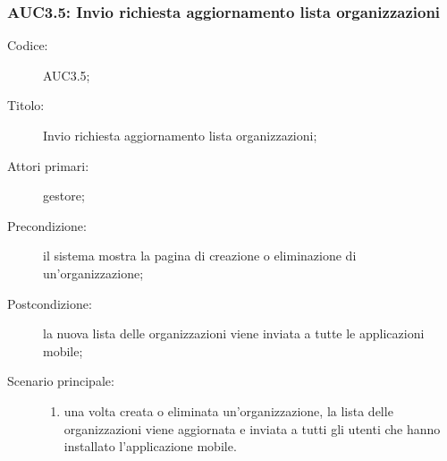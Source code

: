 \documentclass[../../../analisi-dei-requisiti.tex]{subfiles}
\begin{document}
\subsubsection{AUC3.5: Invio richiesta aggiornamento lista organizzazioni}%
\label{subs:AUC3.5}
\begin{description}
  \item[Codice:] AUC3.5;
  \item[Titolo:] Invio richiesta aggiornamento lista organizzazioni;
  \item[Attori primari:] gestore;
  \item[Precondizione:] il sistema mostra la pagina di creazione o eliminazione di un'organizzazione;
  \item[Postcondizione:] la nuova lista delle organizzazioni viene inviata a tutte le applicazioni mobile;
  \item[Scenario principale:]
        \begin{enumerate}
          \item una volta creata o eliminata un'organizzazione, la lista delle organizzazioni viene aggiornata e inviata a tutti gli utenti che hanno installato l'applicazione mobile.
        \end{enumerate}
\end{description}
\end{document}
